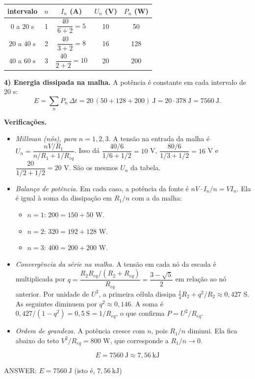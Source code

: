 \documentclass{article}%
\begin{document}
\begin{center}
\begin{tabular}{c|c|c|c|c}
intervalo & $n$ & $I_n$ (A) & $U_n$ (V) & $P_n$ (W)\\\hline
$0$ a $20$ s & 1 & $\dfrac{40}{6+2}=5$ & 10 & 50\\
$20$ a $40$ s & 2 & $\dfrac{40}{3+2}=8$ & 16 & 128\\
$40$ a $60$ s & 3 & $\dfrac{40}{2+2}=10$ & 20 & 200
\end{tabular}
\end{center}

\textbf{4) Energia dissipada na malha.} A potência é constante em cada intervalo de $20$ s:
\[
E=\sum_n P_n\,\Delta t=20\,(50+128+200)\ \mathrm{J}=20\cdot 378\ \mathrm{J}=7560\ \mathrm{J}.
\]

\textbf{Verificações.}
\begin{itemize}
\item \emph{Millman (nós), para $n=1,2,3$.} A tensão na entrada da malha é $U_n=\dfrac{nV/R_1}{n/R_1+1/R_{eq}}$. Isso dá $\dfrac{40/6}{1/6+1/2}=10$ V, $\dfrac{80/6}{1/3+1/2}=16$ V e $\dfrac{20}{1/2+1/2}=20$ V. São os mesmos $U_n$ da tabela.
\item \emph{Balanço de potência.} Em cada caso, a potência da fonte é $nV\cdot I_n/n=VI_n$. Ela é igual à soma da dissipação em $R_1/n$ com a da malha:
 \begin{itemize}
 \item $n=1$: $200=150+50$ W.
 \item $n=2$: $320=192+128$ W.
 \item $n=3$: $400=200+200$ W.
 \end{itemize}
\item \emph{Convergência da série na malha.} A tensão em cada nó da escada é multiplicada por $q=\dfrac{R_2R_{eq}/(R_2+R_{eq})}{R_{eq}}=\dfrac{3-\sqrt5}{2}$ em relação ao nó anterior. Por unidade de $U^2$, a primeira célula dissipa $\tfrac14R_2+q^2/R_2\approx0{,}427$ S. As seguintes diminuem por $q^2\approx0{,}146$. A soma é $0{,}427/(1-q^2)=0{,}5\ \mathrm{S}=1/R_{eq}$, o que confirma $P=U^2/R_{eq}$.
\item \emph{Ordem de grandeza.} A potência cresce com $n$, pois $R_1/n$ diminui. Ela fica abaixo do teto $V^2/R_{eq}=800$ W, que corresponde a $R_1/n\to0$.
\end{itemize}

\[
E = 7560\ \mathrm{J}\approx 7{,}56\ \mathrm{kJ}
\]

ANSWER: $E = 7560\ \mathrm{J}$ (isto é, $7{,}56\ \mathrm{kJ}$)%
\newpage%
\end{document}
